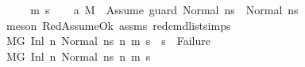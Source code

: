 \begin{isabellebody}
%
\isadelimproof
%
\endisadelimproof
%
\isatagproof
{}\isamarkupfalse%
\ {\isacharminus}{\kern0pt}\isanewline
\ \ \isamarkupfalse%
\ m{}\ s{}\isanewline
\ \ \isamarkupfalse%
\ a{}{\isacharcolon}{\kern0pt}\ {\isachardoublequoteopen}{\isacharparenleft}{\kern0pt}M{\isacharcomma}{\kern0pt}{\isasymLambda}{\isacharcomma}{\kern0pt}{\isasymGamma}{\isacharcomma}{\kern0pt}{\isasymOmega}\ {\isasymturnstile}\ {\isasymlangle}{\isacharbrackleft}{\kern0pt}Assume\ guard{\isacharbrackright}{\kern0pt}{\isacharcomma}{\kern0pt}\ Normal\ ns{}{\isasymrangle}\ {\isacharbrackleft}{\kern0pt}{\isasymrightarrow}{\isacharbrackright}{\kern0pt}\ {\isacharparenleft}{\kern0pt}Normal\ ns{}{\isacharparenright}{\kern0pt}{\isacharparenright}{\kern0pt}{\isachardoublequoteclose}\ \isanewline
\ \ \ \ \isamarkupfalse%
\ {\isacharparenleft}{\kern0pt}meson\ RedAssumeOk\ assms{\isacharparenleft}{\kern0pt}{}{\isacharparenright}{\kern0pt}\ red{\isacharunderscore}{\kern0pt}cmd{\isacharunderscore}{\kern0pt}list{\isachardot}{\kern0pt}simps{\isacharparenright}{\kern0pt}\isanewline
\ \ \isamarkupfalse%
\ {\isachardoublequoteopen}{\isacharparenleft}{\kern0pt}M{\isacharcomma}{\kern0pt}{\isasymLambda}{\isacharcomma}{\kern0pt}{\isasymGamma}{\isacharcomma}{\kern0pt}{\isasymOmega}{\isacharcomma}{\kern0pt}G\ {\isasymturnstile}{\isacharparenleft}{\kern0pt}Inl\ n{}{\isacharcomma}{\kern0pt}\ Normal\ ns{}{\isacharparenright}{\kern0pt}\ {\isacharminus}{\kern0pt}n{\isasymrightarrow}{\isacharasterisk}{\kern0pt}\ {\isacharparenleft}{\kern0pt}m{}{\isacharcomma}{\kern0pt}\ s{}{\isacharparenright}{\kern0pt}{\isacharparenright}{\kern0pt}\ {\isasymLongrightarrow}\ s{}\ {\isasymnoteq}\ Failure{\isachardoublequoteclose}\ \isanewline
\ \ \isamarkupfalse%
\ {\isacharminus}{\kern0pt}\isanewline
\ \ \ \ \isamarkupfalse%
\ {\isachardoublequoteopen}{\isacharparenleft}{\kern0pt}M{\isacharcomma}{\kern0pt}{\isasymLambda}{\isacharcomma}{\kern0pt}{\isasymGamma}{\isacharcomma}{\kern0pt}{\isasymOmega}{\isacharcomma}{\kern0pt}G\ {\isasymturnstile}{\isacharparenleft}{\kern0pt}Inl\ n{}{\isacharcomma}{\kern0pt}\ Normal\ ns{}{\isacharparenright}{\kern0pt}\ {\isacharminus}{\kern0pt}n{\isasymrightarrow}{\isacharasterisk}{\kern0pt}\ {\isacharparenleft}{\kern0pt}m{}{\isacharcomma}{\kern0pt}\ s{}{\isacharparenright}{\kern0pt}{\isacharparenright}{\kern0pt}{\isachardoublequoteclose}\isanewline

\end{isabellebody}
